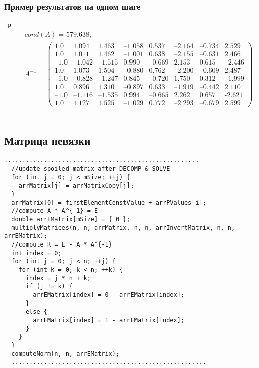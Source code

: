 \documentclass[a4paper,11pt]{article}
\begin{document}
\subsubsection{Пример результатов на одном шаге}
\begin{align*}
  \textbf{p = 1.0} \\
  &cond(A) = 579.638, \\
  &A^{-1} = \begin{pmatrix}
    1.0 & 1.094 & 1.463 & \text{--}1.058 & 0.537 & \text{--}2.164 & \text{--}0.734 & 2.529 \\
    1.0 & 1.011 & 1.462 & \text{--}1.001 & 0.638 & \text{--}2.155 & \text{--}0.631 & 2.466 \\
    \text{--}1.0 & \text{--}1.042 & \text{--}1.515 & 0.990 & \text{--}0.669 & 2.153 & 0.615 & \text{--}2.446 \\
    1.0 & 1.073 & 1.504 & \text{--}0.880 & 0.762 & \text{--}2.200 & \text{--}0.609 & 2.487 \\
    \text{--}1.0 & \text{--}0.828 & \text{--}1.247 & 0.845 & \text{--}0.720 & 1.750 & 0.312 & \text{--}1.999 \\
    1.0 & 0.896 & 1.310 & \text{--}0.897 & 0.633 & \text{--}1.919 & \text{--}0.442 & 2.110 \\
    \text{--}1.0 & \text{--}1.116 & \text{--}1.535 & 0.994 & \text{--}0.665 & 2.262 & 0.657 & \text{-2.621} \\
    1.0 & 1.127 & 1.525 & \text{--}1.029 & 0.772 & \text{--}2.293 & \text{--}0.679 & 2.599
  \end{pmatrix}.
\end{align*}
\\
\subsection{Матрица невязки}
\begin{lstlisting}[label=matrixnorm, caption=Residual matrix]
  ......................................................
  //update spoiled matrix after DECOMP & SOLVE
  for (int j = 0; j < mSize; ++j) {
    arrMatrix[j] = arrMatrixCopy[j];
  }
  arrMatrix[0] = firstElementConstValue + arrPValues[i];
  //compute A * A^{-1} = E
  double arrEMatrix[mSize] = { 0 };
  multiplyMatrices(n, n, arrMatrix, n, n, arrInvertMatrix, n, n, arrEMatrix);
  //compute R = E - A * A^{-1}
  int index = 0;
  for (int j = 0; j < n; ++j) {
    for (int k = 0; k < n; ++k) {
      index = j * n + k;
      if (j != k) {
        arrEMatrix[index] = 0 - arrEMatrix[index];
      }
      else {
        arrEMatrix[index] = 1 - arrEMatrix[index];
      }
    }
  }
  computeNorm(n, n, arrEMatrix);
  ......................................................
\end{lstlisting}
\end{document}
